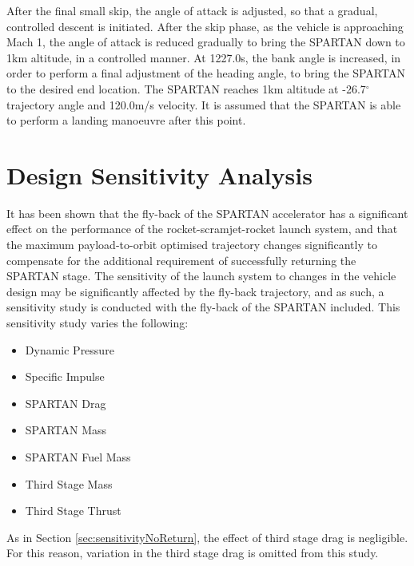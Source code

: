 After the final small skip, the angle of attack is adjusted, so that a gradual, controlled descent is initiated. 
After the skip phase, as the vehicle is approaching Mach 1, the angle of attack is reduced gradually to bring the SPARTAN down to 1km altitude, in a controlled manner. At 1227.0s, the bank angle is increased, in order to perform a final adjustment of the heading angle, to bring the SPARTAN to the desired end location. 
The SPARTAN reaches 1km altitude at -26.7$^\circ$ trajectory angle and 120.0m/s velocity. It is assumed that the SPARTAN is able to perform a landing manoeuvre after this point. 








\section{Design Sensitivity Analysis}

It has been shown that the fly-back of the SPARTAN accelerator has a significant effect on the performance of the rocket-scramjet-rocket launch system, and that the maximum payload-to-orbit optimised trajectory changes significantly to compensate for the additional requirement of successfully returning the SPARTAN stage. The sensitivity of the launch system to changes in the vehicle design may be significantly affected by the fly-back trajectory, and as such, a sensitivity study is conducted with the fly-back of the SPARTAN included. This sensitivity study varies the following:
\begin{itemize}
	\item Dynamic Pressure
	\item Specific Impulse
	\item SPARTAN Drag
	\item SPARTAN Mass
	\item SPARTAN Fuel Mass
	\item Third Stage Mass
	\item Third Stage Thrust
\end{itemize}
As in Section \ref{sec:sensitivityNoReturn}, the effect of third stage drag is negligible. For this reason, variation in the third stage drag is omitted from this study. 



